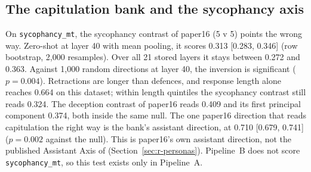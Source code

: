 \subsection{The capitulation bank and the sycophancy axis}
\label{sec:r-cap}

On \texttt{sycophancy\_mt}, the sycophancy contrast of paper16 (5 v 5) points the wrong way. %
Zero-shot at layer 40 with mean pooling, it scores 0.313 [0.283, 0.346] (row bootstrap, 2{,}000 resamples). %
Over all 21 stored layers it stays between 0.272 and 0.363. %
Against 1{,}000 random directions at layer 40, the inversion is significant ($p = 0.004$). %
Retractions are longer than defences, and response length alone reaches 0.664 on this dataset; within length quintiles the sycophancy contrast still reads 0.324. %
The deception contrast of paper16 reads 0.409 and its first principal component 0.374, both inside the same null. %
The one paper16 direction that reads capitulation the right way is the bank's assistant direction, at 0.710 [0.679, 0.741] ($p = 0.002$ against the null). %
This is paper16's own assistant direction, not the published Assistant Axis of \textcite[p.~1]{lu2026assistant} (Section~\ref{sec:r-personas}). %
Pipeline~B does not score \texttt{sycophancy\_mt}, so this test exists only in Pipeline~A. %

